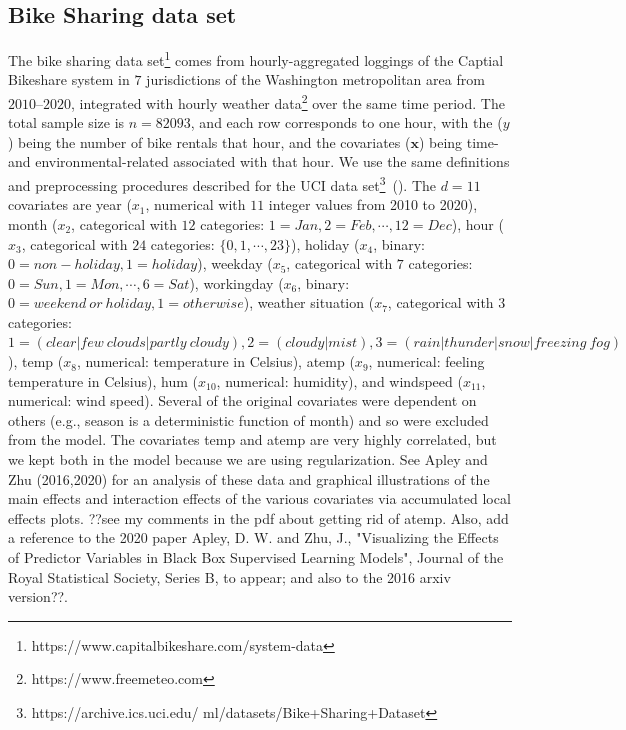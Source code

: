 \documentclass[twoside,11pt]{article}
\begin{document}
\subsection{Bike Sharing data set}
\label{ss:bs_ds}

The bike sharing data set\footnote{https://www.capitalbikeshare.com/system-data} comes from hourly-aggregated loggings of the Captial Bikeshare system in $7$ jurisdictions of the Washington metropolitan area from $2010$--$2020$, integrated with hourly weather data\footnote{https://www.freemeteo.com} over the same time period. The total sample size is $n=82093$, and each row corresponds to one hour, with the ($y$) being the number of bike rentals that hour, and the covariates ($\bm {x}$) being time- and environmental-related associated with that hour. We use the same definitions and preprocessing procedures described for the UCI data set\footnote{https://archive.ics.uci.edu/
ml/datasets/Bike+Sharing+Dataset}~(\cite{fanaee2014event}). The $d=11$ covariates are year ($x_1$, numerical with $11$ integer values from 2010 to 2020), month ($x_2$, categorical with $12$ categories: $1=Jan, 2=Feb, \cdots, 12=Dec$), hour ($x_3$, categorical with $24$ categories: $\{0,1,\cdots,23\}$), holiday ($x_4$, binary: $0=non-holiday,1=holiday$), weekday ($x_5$, categorical with $7$ categories: 
$0=Sun,1=Mon,\cdots,6=Sat$), workingday ($x_6$, binary: $0=weekend~or~holiday,1=otherwise$), weather situation ($x_7$, categorical with $3$ categories: $1 = (clear|few~clouds|partly~cloudy), 2=(cloudy|mist), 3=(rain|thunder|snow|freezing~fog)$), temp ($x_8$, numerical: temperature in Celsius), atemp ($x_9$, numerical: feeling temperature in Celsius), hum ($x_{10}$, numerical: humidity), and windspeed ($x_{11}$, numerical: wind speed). Several of the original covariates were dependent on others (e.g., season is a deterministic function of month) and so were excluded from the model. The covariates temp and atemp are very highly correlated, but we kept both in the model because we are using regularization. See Apley and Zhu (2016,2020) for an analysis of these data and graphical illustrations of the main effects and interaction effects of the various covariates via accumulated local effects plots. ??see my comments in the pdf about getting rid of atemp. Also, add a reference to the 2020 paper Apley, D. W. and Zhu, J., "Visualizing the Effects of Predictor Variables in Black Box Supervised Learning Models", Journal of the Royal Statistical Society, Series B, to appear; and also to the 2016 arxiv version??. 
\end{document}
